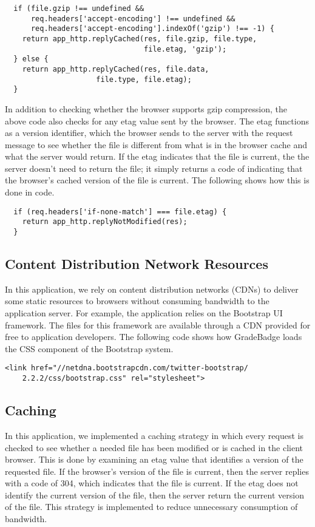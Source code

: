 \begin{lstlisting}
  if (file.gzip !== undefined && 
      req.headers['accept-encoding'] !== undefined && 
      req.headers['accept-encoding'].indexOf('gzip') !== -1) {
    return app_http.replyCached(res, file.gzip, file.type, 
                                file.etag, 'gzip');
  } else {
    return app_http.replyCached(res, file.data, 
                     file.type, file.etag);
  }
\end{lstlisting}

In addition to checking whether the browser supports gzip compression, the above code also checks for any etag value sent by the browser.  The etag functions as a version identifier, which the browser sends to the server with the request message to see whether the file is different from what is in the browser cache and what the server would return.  If the etag indicates that the file is current, the the server doesn't need to return the file; it simply returns a code of indicating that the browser's cached version of the file is current. The following shows how this is done in code.
 
\begin{lstlisting}
  if (req.headers['if-none-match'] === file.etag) {
    return app_http.replyNotModified(res);
  }
\end{lstlisting}

\subsection{Content Distribution Network Resources}
In this application, we rely on content distribution networks (CDNs) to deliver some static resources to browsers without consuming bandwidth to the application server.  For example, the application relies on the Bootstrap UI framework.  The files for this framework are available through a CDN provided for free to application developers.  The following code shows how GradeBadge loads the CSS component of the Bootstrap system.
\begin{lstlisting}
<link href="//netdna.bootstrapcdn.com/twitter-bootstrap/
    2.2.2/css/bootstrap.css" rel="stylesheet">
\end{lstlisting}

\subsection{Caching}
In this application, we implemented a caching strategy in which every request is checked to see whether a needed file has been modified or is cached in the client browser. This is done by examining an etag value that identifies a version of the requested file.  If the browser's version of the file is current, then the server replies with a code of 304, which indicates that the file is current.  If the etag does not identify the current version of the file, then the server return the current version of the file. This strategy is implemented to reduce unnecessary consumption of bandwidth.

